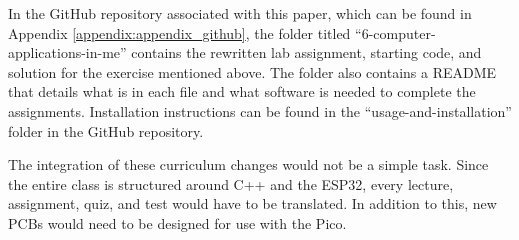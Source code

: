 In the GitHub repository associated with this paper, which can be found in Appendix
\ref{appendix:appendix_github}, the folder titled ``6-computer-applications-in-me'' 
contains the rewritten lab assignment, starting code, and solution for the exercise
mentioned above. The folder also contains a README that details what is in each file
and what software is needed to complete the assignments. Installation instructions can
be found in the ``usage-and-installation'' folder in the GitHub repository.

The integration of these curriculum changes would not be a simple task. Since the 
entire class is structured around C++ and the ESP32, every lecture, assignment, quiz,
and test would have to be translated. In addition to this, new PCBs would need to be 
designed for use with the Pico. 
